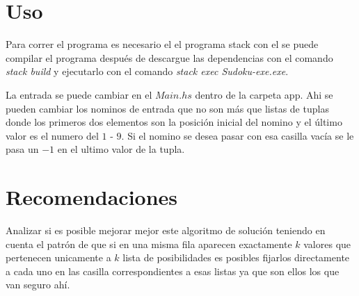 \documentclass[a4paper,10pt,twocolumn]{article}
\begin{document}
   



\section{Uso }
Para correr el programa es necesario el el programa stack con el se puede compilar el programa después de descargue las dependencias con el comando \emph {stack build} y ejecutarlo con el comando \emph{stack exec Sudoku-exe.exe}.
  
La entrada se puede cambiar en el $Main.hs$ dentro de la carpeta app. Ahi se pueden cambiar los nominos de entrada que no son más que listas de tuplas donde los primeros dos elementos son la posición inicial del nomino y el último valor es el numero del $1$ - $9$. Si el nomino se desea pasar con esa casilla vacía se le pasa un $-1 $  en el ultimo valor de la tupla.      
\section{Recomendaciones}\label{sec:rec}

Analizar si es posible mejorar mejor este algoritmo de solución teniendo en cuenta el patrón de que si en una misma fila aparecen exactamente $k $ valores que pertenecen unicamente a $k$ lista de posibilidades es posibles fijarlos directamente a cada uno en las casilla correspondientes a esas listas ya que son ellos los que van seguro ahí.   







\label{end}
\end{document}
